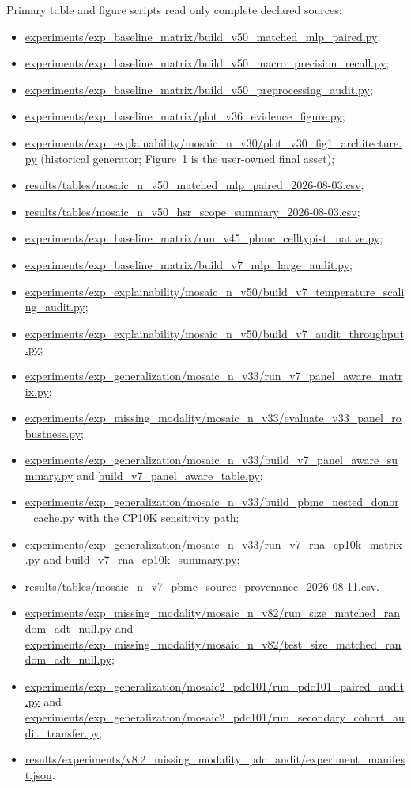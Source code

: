 \documentclass[10pt]{article}
\begin{document}
Primary table and figure scripts read only complete declared sources:
\begin{itemize}
\item \url{experiments/exp_baseline_matrix/build_v50_matched_mlp_paired.py};
\item \url{experiments/exp_baseline_matrix/build_v50_macro_precision_recall.py};
\item \url{experiments/exp_baseline_matrix/build_v50_preprocessing_audit.py};
\item \url{experiments/exp_baseline_matrix/plot_v36_evidence_figure.py};
\item \url{experiments/exp_explainability/mosaic_n_v30/plot_v30_fig1_architecture.py} (historical generator; Figure~1 is the user-owned final asset);
\item \url{results/tables/mosaic_n_v50_matched_mlp_paired_2026-08-03.csv};
\item \url{results/tables/mosaic_n_v50_hsr_scope_summary_2026-08-03.csv};
\item \url{experiments/exp_baseline_matrix/run_v45_pbmc_celltypist_native.py};
\item \url{experiments/exp_baseline_matrix/build_v7_mlp_large_audit.py};
\item \url{experiments/exp_explainability/mosaic_n_v50/build_v7_temperature_scaling_audit.py};
\item \url{experiments/exp_explainability/mosaic_n_v50/build_v7_audit_throughput.py};
\item \url{experiments/exp_generalization/mosaic_n_v33/run_v7_panel_aware_matrix.py};
\item \url{experiments/exp_missing_modality/mosaic_n_v33/evaluate_v33_panel_robustness.py};
\item \url{experiments/exp_generalization/mosaic_n_v33/build_v7_panel_aware_summary.py} and \url{build_v7_panel_aware_table.py};
\item \url{experiments/exp_generalization/mosaic_n_v33/build_pbmc_nested_donor_cache.py} with the CP10K sensitivity path;
\item \url{experiments/exp_generalization/mosaic_n_v33/run_v7_rna_cp10k_matrix.py} and \url{build_v7_rna_cp10k_summary.py};
\item \url{results/tables/mosaic_n_v7_pbmc_source_provenance_2026-08-11.csv}.
\item \url{experiments/exp_missing_modality/mosaic_n_v82/run_size_matched_random_adt_null.py} and \url{experiments/exp_missing_modality/mosaic_n_v82/test_size_matched_random_adt_null.py};
\item \url{experiments/exp_generalization/mosaic2_pdc101/run_pdc101_paired_audit.py} and \url{experiments/exp_generalization/mosaic2_pdc101/run_secondary_cohort_audit_transfer.py};
\item \url{results/experiments/v8.2_missing_modality_pdc_audit/experiment_manifest.json}.
\end{itemize}
\end{document}
